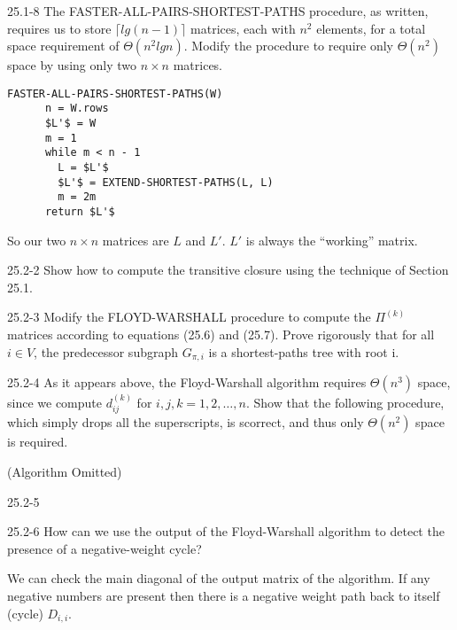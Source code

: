 




\homeworkheader{\classnameandsection}

\begin{problem}{25.1-8}
  The FASTER-ALL-PAIRS-SHORTEST-PATHS procedure, as written, requires us to store $\lceil lg(n-1) \rceil$ matrices,
  each with $n^2$ elements, for a total space requirement of $\Theta(n^2 lg n)$. Modify the procedure to require only
  $\Theta(n^2)$ space by using only two $n \times n$ matrices.
  \begin{solution}
    \begin{lstlisting}[mathescape]
    FASTER-ALL-PAIRS-SHORTEST-PATHS(W)
      n = W.rows
      $L'$ = W
      m = 1
      while m < n - 1
        L = $L'$
        $L'$ = EXTEND-SHORTEST-PATHS(L, L)
        m = 2m
      return $L'$
    \end{lstlisting}
    
    \noindent So our two $n \times n$ matrices are $L$ and $L'$.  $L'$ is always the ``working'' matrix.
  \end{solution}
\end{problem}

\begin{problem}{25.2-2}
  Show how to compute the transitive closure using the technique of Section 25.1.
\end{problem}

\begin{problem}{25.2-3}
  Modify the FLOYD-WARSHALL procedure to compute the $\Pi^{(k)}$ matrices according to equations (25.6) and (25.7).
  Prove rigorously that for all $i \in V$, the predecessor subgraph $G_{\pi,i}$ is a shortest-paths tree with root i.
\end{problem}

\begin{problem}{25.2-4}
  As it appears above, the Floyd-Warshall algorithm requires $\Theta(n^3)$ space, since we compute $d_{ij}^{(k)}$ for
  $i, j, k = 1, 2, \ldots, n$. Show that the following procedure, which simply drops all the superscripts, is scorrect,
  and thus only $\Theta(n^2)$ space is required.

  (Algorithm Omitted)
\end{problem}

\begin{problem}{25.2-5}

\end{problem}

\begin{problem}{25.2-6}
  How can we use the output of the Floyd-Warshall algorithm to detect the presence of a negative-weight cycle?
  \begin{solution}
    We can check the main diagonal of the output matrix of the algorithm.  If any negative numbers are present then
    there is a negative weight path back to itself (cycle) $D_{i,i}$.
  \end{solution}
\end{problem}


